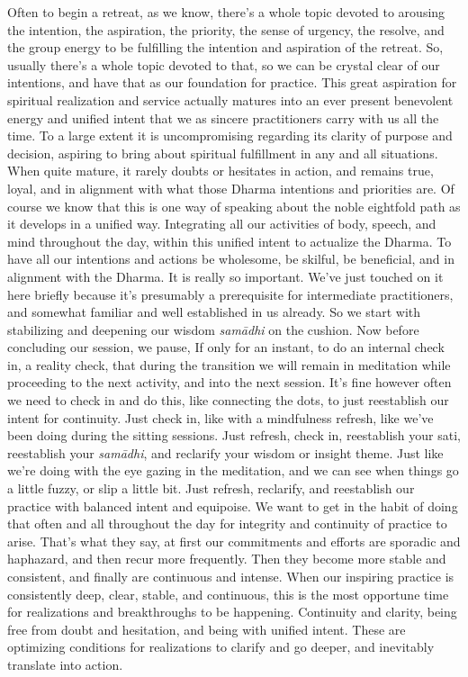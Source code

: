 \documentclass[12pt,openany]{book}
\begin{document}
Often to begin a retreat, as we know, there's a whole topic devoted to arousing the intention, the aspiration, the priority, the sense of urgency, the resolve, and the group energy to be fulfilling the intention and aspiration of the retreat. So, usually there's a whole topic devoted to that, so we can be crystal clear of our intentions, and have that as our foundation for practice. This great aspiration for spiritual realization and service actually matures into an ever present benevolent energy and unified intent that we as sincere practitioners carry with us all the time. To a large extent it is uncompromising regarding its clarity of purpose and decision, aspiring to bring about spiritual fulfillment in any and all situations. When quite mature, it rarely doubts or hesitates in action, and remains true, loyal, and in alignment with what those Dhar\-ma intentions and priorities are. Of course we know that this is one way of speaking about the noble eightfold path as it develops in a unified way. Integrating all our activities of body, speech, and mind throughout the day, within this unified intent to actualize the Dhar\-ma. To have all our intentions and actions be wholesome, be skilful, be beneficial, and in alignment with the Dhar\-ma. It is really so important. We’ve just touched on it here briefly because it's presumably a prerequisite for intermediate practitioners, and somewhat familiar and well established in us already. So we start with stabilizing and deepening our wisdom \textit{sa\-mā\-dhi} on the cushion. Now before concluding our session, we pause, If only for an instant, to do an internal check in, a reality check, that during the transition we will remain in meditation while proceeding to the next activity, and into the next session. It's fine however often we need to check in and do this, like connecting the dots, to just reestablish our intent for continuity. Just check in, like with a mindfulness refresh, like we've been doing during the sitting sessions. Just refresh, check in, reestablish your sati, reestablish your \textit{samādhi}, and reclarify your wisdom or insight theme. Just like we're doing with the eye gazing in the meditation, and we can see when things go a little fuzzy, or slip a little bit. Just refresh, reclarify, and reestablish our practice with balanced intent and equipoise. We want to get in the habit of doing that often and all throughout the day for integrity and continuity of practice to arise. That's what they say, at first our commitments and efforts are sporadic and haphazard, and then recur more frequently. Then they become more stable and consistent, and finally are continuous and intense. When our inspiring practice is consistently deep, clear, stable, and continuous, this is the most opportune time for realizations and breakthroughs to be happening. Continuity and clarity, being free from doubt and hesitation, and being with unified intent. These are optimizing conditions for realizations to clarify and go deeper, and inevitably translate into action. 
\end{document}
